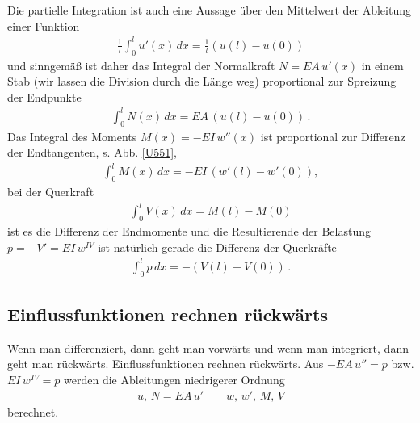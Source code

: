 Die partielle Integration ist auch eine Aussage \"{u}ber den Mittelwert der Ableitung einer Funktion
\begin{align}
\frac{1}{l}\int_{0}^{l} u'(x)\,dx = \frac{1}{l} (u(l) - u(0))
\end{align}
und sinngem\"{a}{\ss} ist daher das Integral der Normalkraft $N = EA\,u'(x)$ in einem Stab (wir lassen die Division durch die L\"{a}nge weg) proportional zur Spreizung der Endpunkte
\begin{align}
\int_{0}^{l} N(x)\,dx = EA\,(u(l) - u(0))\,.
\end{align}
Das Integral des Moments $M(x) = - EI\,w''(x)$ ist proportional zur Differenz der Endtangenten, s. Abb. \ref{U551},
\begin{align}
\int_{0}^{l} M(x) \,dx = - EI\,(w'(l) - w'(0)),
\end{align}
bei der Querkraft
\begin{align}
\int_{0}^{l} V(x)\,dx = M(l) - M(0)
\end{align}
ist es die Differenz der Endmomente und die Resultierende der Belastung $p = -V' = EI\,w^{IV}$ ist nat\"{u}rlich gerade die Differenz der Querkr\"{a}fte
\begin{align}
\int_{0}^{l} p\,dx = - (V(l) - V(0)) \,.
\end{align}

{\textcolor{sectionTitleBlue}{\section{Einflussfunktionen rechnen r\"{u}ckw\"{a}rts}}}

Wenn man differenziert, dann geht man \glq vorw\"{a}rts\grq{} und wenn man integriert, dann geht man \glq r\"{u}ckw\"{a}rts\grq{}. Einflussfunktionen rechnen r\"{u}ckw\"{a}rts. Aus $- EA\,u'' = p$  bzw.  $EI\,w^{IV} = p$ werden die Ableitungen niedrigerer Ordnung
\begin{align}
u,\, N = EA\,u' \qquad w,\,w',\,M, \,V
\end{align}
berechnet.

